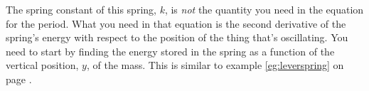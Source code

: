 The spring constant of this spring, $k$, is \emph{not} the quantity
you need in the equation for the period. What you need in that equation
is the second derivative of the spring's energy with respect to the
position of the thing that's oscillating. You need to 
start by finding the energy stored in the spring as a function of
the vertical position, $y$, of the mass. This is similar to
example \ref{eg:leverspring} on page \pageref{eg:leverspring}.



